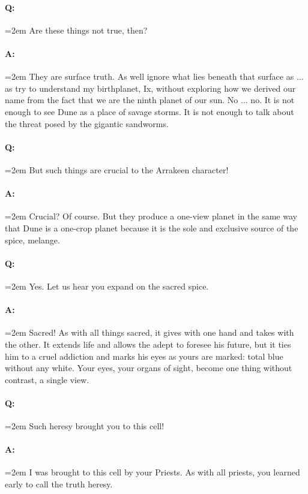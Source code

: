\documentclass[a4paper, 12pt, oldfontcommands, final]{memoir}
\begin{document}
\paragraph{Q:} \hangindent=2em Are these things not true, then?
\paragraph{A:} \hangindent=2em They are surface truth. As well ignore what lies beneath that surface as $\ldots$ as try to understand my birthplanet, Ix, without exploring how we derived our name from the fact that we are the ninth planet of our sun. No $\ldots$ no. It is not enough to see Dune as a place of savage storms. It is not enough to talk about the threat posed by the gigantic sandworms.
\paragraph{Q:} \hangindent=2em But such things are crucial to the Arrakeen character!
\paragraph{A:} \hangindent=2em Crucial? Of course. But they produce a one-view planet in the same way that Dune is a one-crop planet because it is the sole and exclusive source of the spice, melange.
\paragraph{Q:} \hangindent=2em Yes. Let us hear you expand on the sacred spice.
\paragraph{A:} \hangindent=2em Sacred! As with all things sacred, it gives with one hand and takes with the other. It extends life and allows the adept to foresee his future, but it ties him to a cruel addiction and marks his eyes as yours are marked: total blue without any white. Your eyes, your organs of sight, become one thing without contrast, a single view.
\paragraph{Q:} \hangindent=2em Such heresy brought you to this cell!
\paragraph{A:} \hangindent=2em I was brought to this cell by your Priests. As with all priests, you learned early to call the truth heresy.
\end{document}
